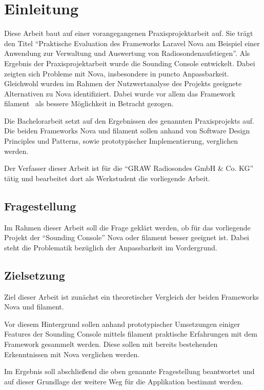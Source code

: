 \section{Einleitung}

Diese Arbeit baut auf einer vorangegangenen Praxisprojektarbeit auf.
Sie trägt den Titel \enquote{Praktische Evaluation des Frameworks Laravel Nova am Beispiel einer Anwendung zur Verwaltung und Auswertung von Radiosondenaufstiegen}.
Als Ergebnis der Praxisprojektarbeit wurde die Sounding Console entwickelt.
Dabei zeigten sich Probleme mit Nova, insbesondere in puncto Anpassbarkeit.
Gleichwohl wurden im Rahmen der Nutzwertanalyse des Projekts geeignete Alternativen zu Nova identifiziert.
Dabei wurde vor allem das Framework filament~\cite{filament} als bessere Möglichkeit in Betracht gezogen.

Die Bachelorarbeit setzt auf den Ergebnissen des genannten Praxisprojekts auf.
Die beiden Frameworks Nova und filament sollen anhand von Software Design Principles und Patterns, sowie prototypischer Implementierung, verglichen werden.

Der Verfasser dieser Arbeit ist für die \enquote{GRAW Radiosondes GmbH \& Co. KG}\cite{graw} tätig und bearbeitet dort als Werkstudent die vorliegende Arbeit.

\subsection{Fragestellung}
Im Rahmen dieser Arbeit soll die Frage geklärt werden, ob für das vorliegende Projekt der \enquote{Sounding Console} Nova oder filament besser geeignet ist.
Dabei steht die Problematik bezüglich der Anpassbarkeit im Vordergrund.

\subsection{Zielsetzung}
Ziel dieser Arbeit ist zunächst ein theoretischer Vergleich der beiden Frameworks Nova und filament.

Vor diesem Hintergrund sollen anhand prototypischer Umsetzungen einiger Features der Sounding Console mittels filament praktische Erfahrungen mit dem Framework gesammelt werden.
Diese sollen mit bereits bestehenden Erkenntnissen mit Nova verglichen werden.

Im Ergebnis soll abschließend die oben genannte Fragestellung beantwortet und auf dieser Grundlage der weitere Weg für die Applikation bestimmt werden.
